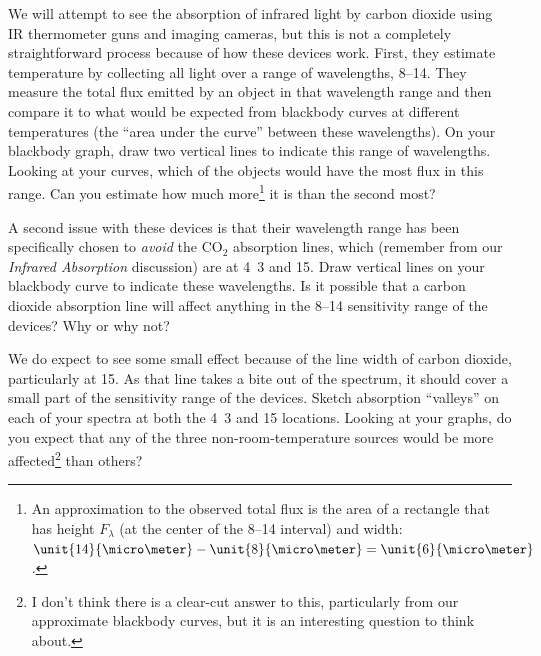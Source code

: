 \noindent We will attempt to see the absorption of infrared light by carbon dioxide using IR thermometer guns and imaging cameras, but this is not a completely straightforward process because of how these devices work.  First, they estimate temperature by collecting all light over a range of wavelengths, 8--\unit{14}{\micro\meter}.  They measure the total flux emitted by an object in that wavelength range and then compare it to what would be expected from blackbody curves at different temperatures (the ``area under the curve'' between these wavelengths).  On your blackbody graph, draw two vertical lines to indicate this range of wavelengths.  Looking at your curves, which of the objects would have the most flux in this range.  Can you estimate how much more\footnote{An approximation to the observed total flux is the area of a rectangle that has height $F_\lambda$ (at the center of the 8--\unit{14}{\micro\meter} interval) and width: $\unit{14}{\micro\meter} - \unit{8}{\micro\meter} = \unit{6}{\micro\meter}$.} it is than the second most?

\answerspace

\noindent A second issue with these devices is that their wavelength range has been specifically chosen to {\em avoid} the $\text{CO}_2$ absorption lines, which (remember from our {\em Infrared Absorption} discussion) are at \unit{4.3}{ \micro\meter} and \unit{15}{\micro\meter}.  Draw vertical lines on your blackbody curve to indicate these wavelengths.  Is it possible that a carbon dioxide absorption line will affect anything in the 8--\unit{14}{\micro\meter} sensitivity range of the devices?  Why or why not?

\answerspace

\noindent We do expect to see some small effect because of the line width of carbon dioxide, particularly at \unit{15}{\micro\meter}.  As that line takes a bite out of the spectrum, it should cover a small part of the sensitivity range of the devices.  Sketch absorption ``valleys'' on each of your spectra at both the \unit{4.3}{\micro\meter} and  \unit{15}{\micro\meter} locations.  Looking at your graphs, do you expect that any of the three non-room-temperature sources would be more affected\footnote{I don't think there is a clear-cut answer to this, particularly from our approximate blackbody curves, but it is an interesting question to think about.} than others?



\newpage


